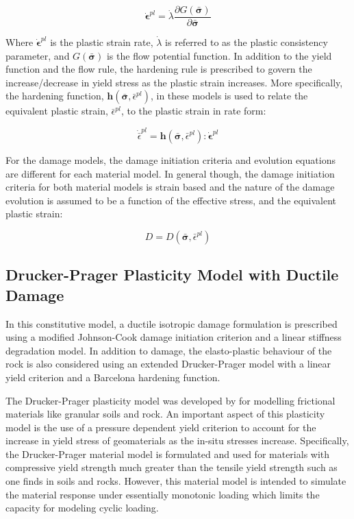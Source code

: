 \begin{equation}
\dot{\boldsymbol{\epsilon}}^{pl}=\dot{\lambda} \frac{\partial G\left(\bar{\boldsymbol{\sigma}}\right)}{\partial \bar{\boldsymbol{\sigma}}}
\label{eqn:gen6}
\end{equation}

Where $\dot{\boldsymbol{\epsilon}}^{pl}$ is the plastic strain rate, $\dot{\lambda}$ is referred to as the plastic consistency parameter, and $G\left(\bar{\boldsymbol{\sigma}}\right)$ is the flow potential function. In addition to the yield function and the flow rule, the hardening rule is prescribed to govern the increase/decrease in yield stress as the plastic strain increases. More specifically, the hardening function, $\boldsymbol{h}\left(\bar{\boldsymbol{\sigma}}, \bar{\epsilon}^{pl}\right)$, in these models is used to relate the equivalent plastic strain, $\bar{\epsilon}^{pl}$,  to the plastic strain in rate form: 

\begin{equation}
    \dot{\bar{\epsilon}}^{pl} 
    = 
    \boldsymbol{h}\left(\bar{\boldsymbol{\sigma}}, \bar{\epsilon}^{pl}\right):
    \dot{\boldsymbol{\epsilon}}^{pl}
\label{eqn:gen7}
\end{equation}

For the damage models, the damage initiation criteria and evolution equations are different for each material model. In general though, the damage initiation criteria for both material models is strain based and the nature of the damage evolution is assumed to be a function of the effective stress, and the equivalent plastic strain:

\begin{equation}
D=D\left(\bar{\boldsymbol{\sigma}},\bar{\epsilon}^{pl}\right)
\label{eqn:gen8}
\end{equation}

\subsection{Drucker-Prager Plasticity Model with Ductile Damage}

In this constitutive model, a ductile isotropic damage formulation is prescribed using a modified Johnson-Cook damage initiation criterion and a linear stiffness degradation model. In addition to damage, the elasto-plastic behaviour of the rock is also considered using an extended Drucker-Prager model with a linear yield criterion and a Barcelona hardening function. 

The Drucker-Prager plasticity model was developed by \citet{drucker_implications_1950} for modelling frictional materials like granular soils and rock. An important aspect of this plasticity model is the use of a pressure dependent yield criterion to account for the increase in yield stress of geomaterials as the in-situ stresses increase. Specifically, the Drucker-Prager material model is formulated and used for materials with compressive yield strength much greater than the tensile yield strength such as one finds in soils and rocks. However, this material model is intended to simulate the material response under essentially monotonic loading which limits the capacity for modeling cyclic loading.

